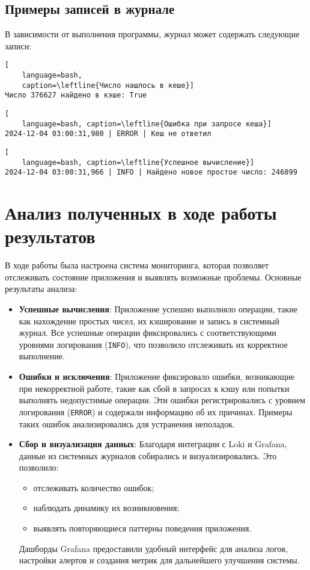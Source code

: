 \subsection{Примеры записей в журнале}

В зависимости от выполнения программы, журнал может содержать следующие записи:

\begin{lstlisting}[
	language=bash,
	caption=\leftline{Число нашлось в кеше}]
Число 376627 найдено в кэше: True
\end{lstlisting}

\begin{lstlisting}[
	language=bash, caption=\leftline{Ошибка при запросе кеша}]
2024-12-04 03:00:31,980 | ERROR | Кеш не ответил
\end{lstlisting}

\begin{lstlisting}[
	language=bash, caption=\leftline{Успешное вычисление}]
2024-12-04 03:00:31,966 | INFO | Найдено новое простое число: 246899
\end{lstlisting}



\section{Анализ полученных в ходе работы результатов}

В ходе работы была настроена система мониторинга,
которая позволяет отслеживать состояние приложения
и выявлять возможные проблемы.
Основные результаты анализа:

\begin{itemize}
	\item \textbf{Успешные вычисления}:
	Приложение успешно выполняло операции, такие как нахождение простых чисел, их кэширование и запись в системный
	журнал.
	Все успешные операции фиксировались с соответствующими уровнями логирования (\texttt{INFO}), что позволило
	отслеживать их корректное выполнение.

	\item \textbf{Ошибки и исключения}:
	Приложение фиксировало ошибки, возникающие при некорректной работе, такие как сбой в запросах к кэшу или попытки
	выполнять недопустимые операции.
	Эти ошибки регистрировались с уровнем логирования (\texttt{ERROR}) и содержали информацию об их причинах.
	Примеры таких ошибок анализировались для устранения неполадок.

	\item \textbf{Сбор и визуализация данных}:
	Благодаря интеграции с Loki и Grafana, данные из системных журналов собирались и визуализировались.
	Это позволило:
	\begin{itemize}
		\item отслеживать количество ошибок;
		\item наблюдать динамику их возникновения;
		\item выявлять повторяющиеся паттерны поведения приложения.
	\end{itemize}
	Дашборды Grafana предоставили удобный интерфейс для анализа логов, настройки алертов и создания метрик для дальнейшего улучшения системы.
\end{itemize}

